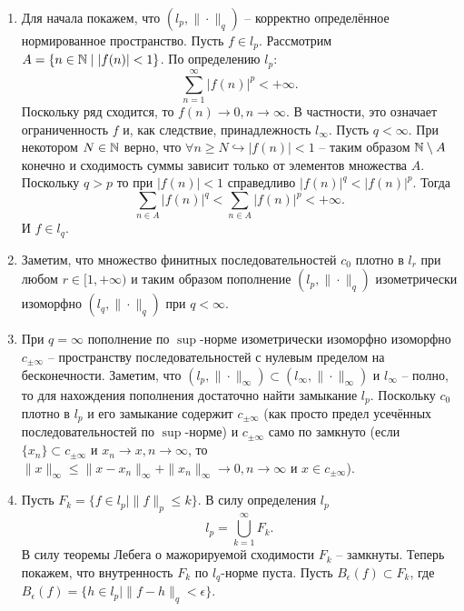 \begin{solve}
    \begin{enumerate}
        \item Для начала покажем, что $(l_p, \|\cdot\|_q)$ -- корректно определённое нормированное пространство. Пусть $f \in l_p$. Рассмотрим $A = \{n \in \mathbb{N} \mid |f(n)| < 1\}$. По определению $l_p\colon$
        \[
            \sum\limits_{n = 1}^{\infty} |f(n)|^p < +\infty.
        \]
        Поскольку ряд сходится, то $f(n) \rightarrow 0, n \rightarrow \infty$. В частности, это означает ограниченность $f$ и, как следствие, принадлежность $l_\infty$. Пусть $q < \infty$. При некотором $N \in \mathbb{N}$ верно, что $\forall n \geq N \hookrightarrow |f(n)| < 1$ -- таким образом $\mathbb{N} \setminus A$ конечно и сходимость суммы зависит только от элементов множества $A$. Поскольку $q > p$ то при $|f(n)| < 1$ справедливо $|f(n)|^q < |f(n)|^p$. Тогда
        \[
            \sum\limits_{n \in A} |f(n)|^q < \sum\limits_{n \in A} |f(n)|^p < +\infty.
        \]
        И $f \in l_q$.
        \item Заметим, что множество финитных последовательностей $c_0$ плотно в $l_r$ при любом $r \in [1, +\infty)$ и таким образом пополнение $(l_p, \|\cdot\|_q)$ изометрически изоморфно $(l_q, \|\cdot\|_q)$ при $q < \infty$.
        \item При $q = \infty$ пополнение по $\sup$-норме изометрически изоморфно изоморфно $c_{\pm\infty}$ -- пространству последовательностей с нулевым пределом на бесконечности. Заметим, что $(l_p, \|\cdot\|_\infty) \subset (l_\infty, \|\cdot\|_\infty)$ и $l_\infty$ -- полно, то для нахождения пополнения достаточно найти замыкание $l_p$. Поскольку $c_0$ плотно в $l_p$ и его замыкание содержит $c_{\pm\infty}$ (как просто предел усечённых последовательностей по $\sup$-норме) и $c_{\pm\infty}$ само по замкнуто (если $\{x_n\} \subset c_{\pm\infty}$ и $x_n \rightarrow x, n \rightarrow \infty$, то $\|x\|_\infty \leq \|x - x_n\|_\infty + \|x_n\|_\infty \rightarrow 0, n \rightarrow \infty$ и $x \in c_{\pm\infty}$).
        \item Пусть $F_k = \{f \in l_p \mid \|f\|_p \leq k\}$. В силу определения $l_p$
        \[
            l_p = \bigcup_{k = 1}^{\infty} F_k.
        \]
        В силу теоремы Лебега о мажорируемой сходимости $F_k$ -- замкнуты. Теперь покажем, что внутренность $F_k$ по $l_q$-норме пуста. Пусть $B_\epsilon(f) \subset F_k$, где $B_\epsilon(f) = \{h \in l_p \mid \|f - h\|_q < \epsilon\}$.


\end{enumerate}
\end{solve}
